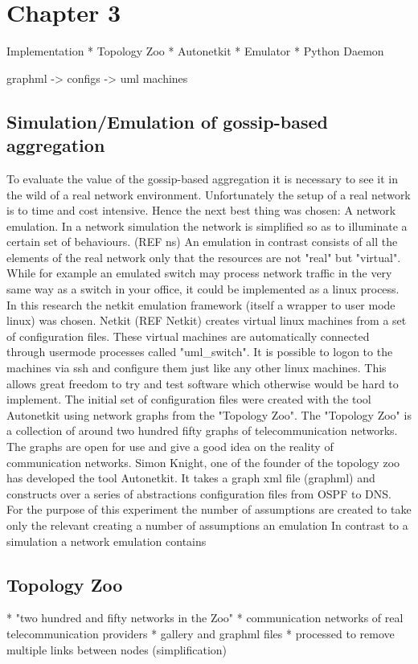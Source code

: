 \documentclass[11pt,a4paper]{article}
\begin{document}
\section{Chapter 3}
Implementation
* Topology Zoo
* Autonetkit
* Emulator
* Python Daemon

graphml -> configs -> uml machines
\subsection{Simulation/Emulation of gossip-based aggregation}
To evaluate the value of the gossip-based aggregation it is necessary to see it in the wild of a real network environment. Unfortunately the setup of a real network is to time and cost intensive. Hence the next best thing was chosen: A network emulation. In a network simulation the network is simplified so as to illuminate a certain set of behaviours. (REF ns) An emulation in contrast consists of all the elements of the real network only that the resources are not "real" but "virtual". While for example an emulated switch may process network traffic in the very same way as a switch in your office, it could be implemented as a linux process.
In this research the netkit emulation framework (itself a wrapper to user mode linux) was chosen. Netkit (REF Netkit) creates virtual linux machines from a set of configuration files. These virtual machines are automatically connected through usermode processes called "uml\_switch". It is possible to logon to the machines via ssh and configure them just like any other linux machines. This allows great freedom to try and test software which otherwise would be hard to implement.
The initial set of configuration files were created with the tool Autonetkit using network graphs from the "Topology Zoo". The "Topology Zoo" is a collection of around two hundred fifty graphs of telecommunication networks. The graphs are open for use and give a good idea on the reality of communication networks. Simon Knight, one of the founder of the topology zoo has developed the tool Autonetkit. It takes a graph xml file (graphml) and constructs over a series of abstractions configuration files from OSPF to DNS.
For the purpose of this experiment the
number of assumptions are created to take only the relevant creating a number of assumptions an emulation In contrast to a simulation a network emulation contains
\subsection{Topology Zoo}
* "two hundred and fifty networks in the Zoo"
* communication networks of real telecommunication providers
* gallery and graphml files
* processed to remove multiple links between nodes (simplification)
\end{document}
